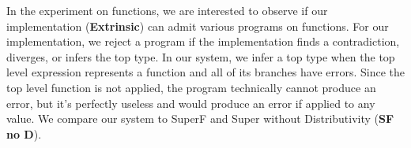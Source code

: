 \documentclass[acmsmall]{acmart}
\theoremstyle{definition}
\begin{document}
\noindent
In the experiment on functions, we 
are interested to observe if our implementation (\textbf{Extrinsic})
can admit various programs on functions. 
For our implementation, we reject a program if the implementation
finds a contradiction, diverges, or infers the top type. 
In our system, we infer a top type when the top level 
expression represents a function and all of its branches 
have errors. Since the top level function is not applied,
the program technically cannot produce an error, but it's 
perfectly useless and would produce an error if applied to any value. 
We compare our system to SuperF and Super without Distributivity (\textbf{SF no D}). 

\end{document}
